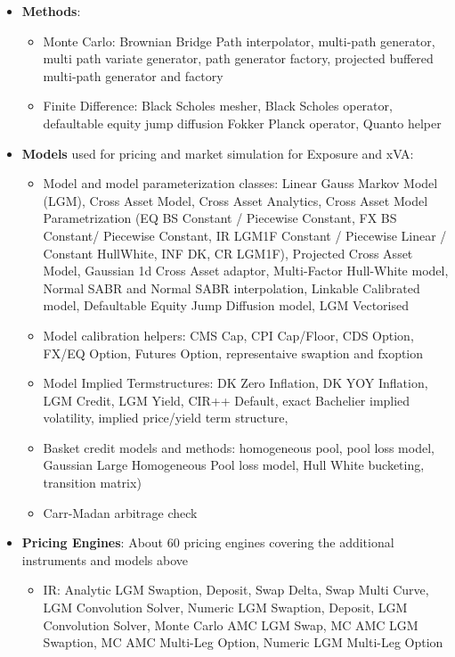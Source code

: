 \documentclass[12pt, a4paper]{report}
\begin{document}
\begin{itemize}
\begin{itemize}
  \end{itemize}
\item {\bf Methods}:
  \begin{itemize}
  \item Monte Carlo: Brownian Bridge Path interpolator, multi-path generator, multi path variate generator, path generator factory,  projected buffered multi-path generator and factory
  \item Finite Difference: Black Scholes mesher, Black Scholes operator, defaultable equity jump diffusion Fokker Planck operator, Quanto helper
  \end{itemize}
\item {\bf Models} used for pricing and market simulation for Exposure and xVA: 
  \begin{itemize}
  \item Model and model parameterization classes: Linear Gauss Markov Model (LGM), Cross Asset Model, Cross Asset Analytics, Cross Asset Model Parametrization (EQ BS Constant / Piecewise Constant, FX BS Constant/ Piecewise Constant, IR LGM1F Constant / Piecewise Linear / Constant HullWhite, INF DK, CR LGM1F), Projected Cross Asset Model, Gaussian 1d Cross Asset adaptor, Multi-Factor Hull-White model, Normal SABR and Normal SABR interpolation, Linkable Calibrated model, Defaultable Equity Jump Diffusion model, LGM Vectorised
  \item Model calibration helpers: CMS Cap, CPI Cap/Floor, CDS Option, FX/EQ Option, Futures Option, representaive swaption and fxoption
  \item Model Implied Termstructures: DK Zero Inflation, DK YOY Inflation, LGM Credit, LGM Yield, CIR++ Default, exact Bachelier implied volatility, implied price/yield term structure,
  \item Basket credit models and methods: homogeneous pool, pool loss model, Gaussian Large Homogeneous Pool loss model, Hull White bucketing, transition matrix)
  \item Carr-Madan arbitrage check
    \end{itemize}
\item {\bf Pricing Engines}: About 60 pricing engines covering the additional instruments and models above
  \begin{itemize}
  \item IR: Analytic LGM Swaption, Deposit, Swap Delta, Swap Multi Curve, LGM Convolution Solver, Numeric LGM Swaption, Deposit, LGM Convolution Solver, Monte Carlo AMC LGM Swap, MC AMC LGM Swaption, MC AMC Multi-Leg Option, Numeric LGM Multi-Leg Option

\end{itemize}
\end{itemize}
\end{document}
